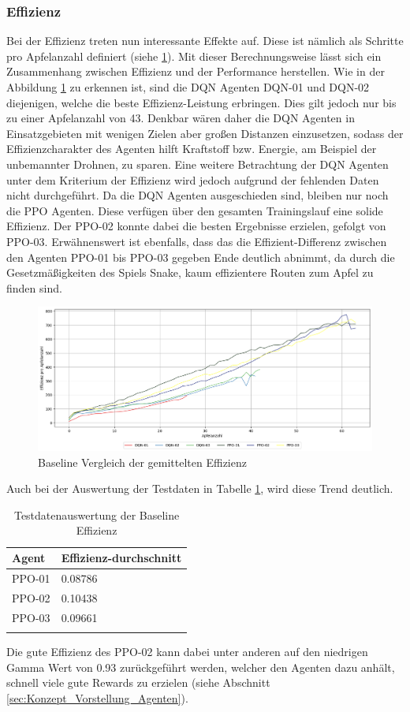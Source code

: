 \subsubsection{Effizienz}
Bei der Effizienz treten nun interessante Effekte auf. Diese ist nämlich als Schritte pro Apfelanzahl definiert (siehe \ref{fig:Evaluation_Baseline_Effizienz}). Mit dieser Berechnungsweise lässt sich ein Zusammenhang zwischen Effizienz und der Performance herstellen. 
Wie in der Abbildung \ref{fig:Evaluation_Baseline_Effizienz} zu erkennen ist, sind die DQN Agenten DQN-01 und DQN-02 diejenigen, welche die beste Effizienz-Leistung erbringen. Dies gilt jedoch nur bis zu einer Apfelanzahl von 43. Denkbar wären daher die DQN Agenten in Einsatzgebieten mit wenigen Zielen aber großen Distanzen einzusetzen, sodass der Effizienzcharakter des Agenten hilft Kraftstoff bzw. Energie, am Beispiel der unbemannter Drohnen, zu sparen. Eine weitere Betrachtung der DQN Agenten unter dem Kriterium der Effizienz wird jedoch aufgrund der fehlenden Daten nicht durchgeführt.
Da die DQN Agenten ausgeschieden sind, bleiben nur noch die PPO Agenten. Diese verfügen über den gesamten Trainingslauf eine solide Effizienz. 
Der PPO-02 konnte dabei die besten Ergebnisse erzielen, gefolgt von PPO-03.
Erwähnenswert ist ebenfalls, dass das die Effizient-Differenz zwischen den Agenten PPO-01 bis PPO-03 gegeben Ende deutlich abnimmt, da durch die Gesetzmäßigkeiten des Spiels Snake, kaum effizientere Routen zum Apfel zu finden sind.
\begin{figure}[H]
	\centering
	\includegraphics[scale=0.4517]{Abbildungen/Evaluation/baseline-effizienz.png}
	\caption[Baseline Vergleich Effizienz]{Baseline Vergleich der gemittelten Effizienz}
	\label{fig:Evaluation_Baseline_Effizienz}
\end{figure}
Auch bei der Auswertung der Testdaten in Tabelle \ref{tab:Evaluation_Testdaten_Effizienz}, wird diese Trend deutlich.
\begin{longtable}[h]{|p{3.5cm}|p{4.0cm}|}
	\hline
	Agent & Effizienz-durchschnitt \\
	\hline
	PPO-01 & 0.08786 \\
	\hline
	PPO-02 & 0.10438 \\
	\hline
	PPO-03 & 0.09661 \\
	\hline
	\caption{Testdatenauswertung der Baseline Effizienz}
	\label{tab:Evaluation_Testdaten_Effizienz} 
\end{longtable}
Die gute Effizienz des PPO-02 kann dabei unter anderen auf den niedrigen Gamma Wert von 0.93 zurückgeführt werden, welcher den Agenten dazu anhält, schnell viele gute Rewards zu erzielen (siehe Abschnitt \ref{sec:Konzept_Vorstellung_Agenten}).

